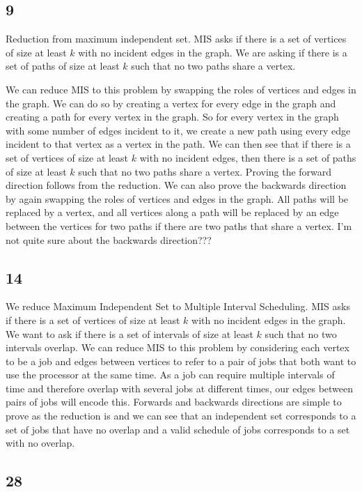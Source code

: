 \documentclass[11pt]{article}
\begin{document}
\subsection{9}

Reduction from maximum independent set. MIS asks if there is a set of vertices of size at least $k$ with no incident edges in the graph. We are asking if there is a set of paths of size at least $k$ such that no two paths share a vertex.

We can reduce MIS to this problem by swapping the roles of vertices and edges in the graph. We can do so by creating a vertex for every edge in the graph and creating a path for every vertex in the graph. So for every vertex in the graph with some number of edges incident to it, we create a new path using every edge incident to that vertex as a vertex in the path. We can then see that if there is a set of vertices of size at least $k$ with no incident edges, then there is a set of paths of size at least $k$ such that no two paths share a vertex. Proving the forward direction follows from the reduction. We can also prove the backwards direction by again swapping the roles of vertices and edges in the graph. All paths will be replaced by a vertex, and all vertices along a path will be replaced by an edge between the vertices for two paths if there are two paths that share a vertex. I'm not quite sure about the backwards direction???

\subsection{14}

We reduce Maximum Independent Set to Multiple Interval Scheduling. MIS asks if there is a set of vertices of size at least $k$ with no incident edges in the graph. We want to ask if there is a set of intervals of size at least $k$ such that no two intervals overlap. We can reduce MIS to this problem by considering each vertex to be a job and edges between vertices to refer to a pair of jobs that both want to use the processor at the same time. As a job can require multiple intervals of time and therefore overlap with several jobs at different times, our edges between pairs of jobs will encode this. Forwards and backwards directions are simple to prove as the reduction is and we can see that an independent set corresponds to a set of jobs that have no overlap and a valid schedule of jobs corresponds to a set with no overlap.

\subsection{28}
\end{document}
